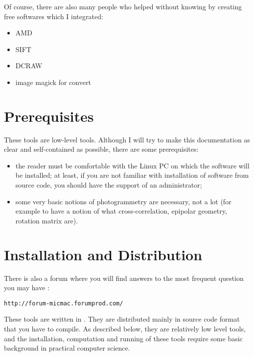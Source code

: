 Of course, there are also many people who helped without knowing by creating
free softwares which I integrated:


\begin{itemize}
   \item    AMD
   \item    SIFT
   \item    DCRAW
   \item    image magick for convert
\end{itemize}


\section{Prerequisites}

These tools are low-level tools. Although I will try to make this
documentation as clear and self-contained as possible, there are some
prerequisites:

\begin{itemize}
   \item the reader must be comfortable with the Linux PC on which the software
         will be installed; at least, if you are not familiar with installation
         of software from source code, you should have the support of 
         an administrator;

   \item some very basic notions of photogrammetry are necessary, not a lot
         (for example to have a notion of what cross-correlation,
         epipolar geometry, rotation matrix are).
\end{itemize}


\section{Installation and Distribution}

There is also a forum where you will find answers to the most frequent question 
you may have :

\begin{verbatim}
http://forum-micmac.forumprod.com/
\end{verbatim}



\label{Install}
These tools are written in \CPP. They are distributed mainly in source code
format that you have to compile. As described below, they are relatively
low level tools, and the installation, computation and running of these
tools require some basic background in practical computer science.

